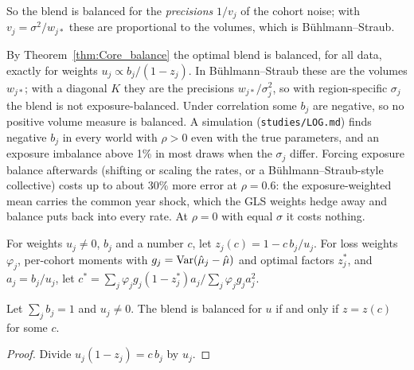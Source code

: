 So the blend is balanced for the \emph{precisions} $1/v_j$ of the cohort
noise; with $v_j = \sigma^2/w_{j*}$ these are proportional to the volumes,
which is Bühlmann--Straub.

\begin{remark}\label{rem:balance_correlation}
  By Theorem~\ref{thm:Core_balance} the optimal blend is balanced, for all
  data, exactly for weights $u_j \propto b_j/(1 - z_j)$. In Bühlmann--Straub
  these are the volumes $w_{j*}$; with a diagonal $K$ they are the precisions
  $w_{j*}/\sigma_j^2$, so with region-specific $\sigma_j$ the blend is not
  exposure-balanced. Under correlation some $b_j$ are negative, so no
  positive volume measure is balanced. A simulation
  (\texttt{studies/LOG.md}) finds negative $b_j$ in every world with
  $\rho > 0$ even with the true parameters, and an exposure imbalance above
  1\% in most draws when the $\sigma_j$ differ. Forcing exposure balance
  afterwards (shifting or scaling the rates, or a Bühlmann--Straub-style
  collective) costs up to about 30\% more error at $\rho = 0.6$: the
  exposure-weighted mean carries the common year shock, which the GLS
  weights hedge away and balance puts back into every rate. At $\rho = 0$
  with equal $\sigma$ it costs nothing.
\end{remark}

\begin{definition}\label{def:Core_balancedZ}
  \leanok
  For weights $u_j \ne 0$, $b_j$ and a number $c$, let
  $z_j(c) = 1 - c\,b_j/u_j$. For loss weights $\varphi_j$, per-cohort moments
  with $g_j = \operatorname{Var}(\hat\mu_j - \hat\mu)$ and optimal factors $z_j^*$, and
  $a_j = b_j/u_j$, let
  $c^* = \sum_j\varphi_j g_j(1 - z_j^*)a_j \big/ \sum_j\varphi_j g_j a_j^2$.
\end{definition}

\begin{lemma}\label{lem:Core_balanced_line}
  \leanok
  Let $\sum_j b_j = 1$ and $u_j \ne 0$. The blend is balanced for $u$ if and
  only if $z = z(c)$ for some $c$.
\end{lemma}
\begin{proof}
  \leanok
  Divide $u_j(1 - z_j) = c\,b_j$ by $u_j$.
\end{proof}

